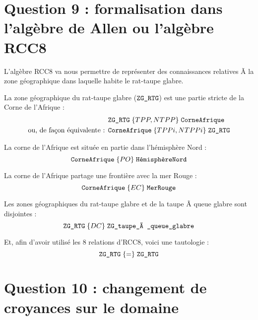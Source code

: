 \documentclass[11pt, a4paper]{article}
\def\fm#1{\text{\texttt{#1}}}
\begin{document}
	\section*{Question 9 : formalisation dans l'algèbre de Allen ou l'algèbre RCC8}
	
	\def\Afrique{\fm{Afrique}}
	\def\CorneAfrique{\fm{CorneAfrique}}
	\def\HemisphereNord{\fm{HémisphèreNord}}
	\def\MerRouge{\fm{MerRouge}}
	\def\ZGRTG{\fm{ZG\_RTG}}
	
	L'algèbre RCC8 va nous permettre de représenter des connaissances relatives
	Ã  la zone géographique dans laquelle habite le rat-taupe glabre.
	
	La zone géographique du rat-taupe glabre ($\ZGRTG$) est une partie stricte de la Corne
	de l'Afrique :
	\begin{align*}
	&\ZGRTG \mathrel{\{TPP, NTPP\}} \CorneAfrique
	\\
	\text{ou, de façon équivalente : }
	&\CorneAfrique \mathrel{\{TPPi, NTPPi\}} \ZGRTG
	\end{align*}
	
	La corne de l'Afrique est située en partie dans l'hémisphère Nord :
	\begin{equation*}
	\CorneAfrique \mathrel{\{PO\}} \HemisphereNord
	\end{equation*}
	
	La corne de l'Afrique partage une frontière avec la mer Rouge :
	\begin{equation*}
	\CorneAfrique \mathrel{\{EC\}} \MerRouge
	\end{equation*}
	
	Les zones géographiques du rat-taupe glabre et de la taupe Ã  queue glabre
	sont disjointes :
	\begin{equation*}
	\ZGRTG \mathrel{\{DC\}} \fm{ZG\_taupe\_Ã \_queue\_glabre}
	\end{equation*}
	
	Et, afin d'avoir utilisé les $8$ relations d'RCC8, voici une
	tautologie :
	\begin{equation*}
	\ZGRTG \mathrel{\{=\}} \ZGRTG
	\end{equation*}
	
	\section*{Question 10 : changement de croyances sur le domaine}
	\def\rev{\dotplus}
	\def\contraction{\dotdiv}
	\def\dist{d_H}
	\def\F{\fm{F}}
	\def\V{\fm{V}}
	\def\interpretation{{\mathcal{I}}}
	\def\interpretationJ{{\mathcal{J}}}
	\def\I#1{\interpretation_{#1}}
	\def\Mod{{\mathcal{M}}}
	\def\poids#1{w_{#1}}
	
\end{document}
